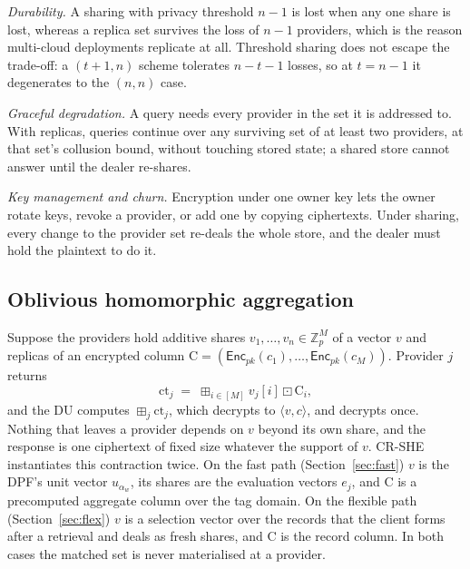 \documentclass[a4paper,fleqn]{cas-sc}
\newcommand{\Enc}{\mathsf{Enc}}
\newcommand{\bplus}{\boxplus}
\newcommand{\bdot}{\boxdot}
\begin{document}
\emph{Durability.} A sharing with privacy threshold $n-1$ is lost when any one
share is lost, whereas a replica set survives the loss of $n-1$ providers,
which is the reason multi-cloud deployments replicate at all. Threshold
sharing does not escape the trade-off: a $(t{+}1,n)$ scheme tolerates
$n-t-1$ losses, so at $t=n-1$ it degenerates to the $(n,n)$ case.

\emph{Graceful degradation.} A query needs every provider in the set it is
addressed to. With replicas, queries continue over any surviving set of at
least two providers, at that set's collusion bound, without touching stored
state; a shared store cannot answer until the dealer re-shares.

\emph{Key management and churn.} Encryption under one owner key lets the owner
rotate keys, revoke a provider, or add one by copying ciphertexts. Under
sharing, every change to the provider set re-deals the whole store, and the
dealer must hold the plaintext to do it.

\subsection{Oblivious homomorphic aggregation}
\label{sec:oha}
Suppose the providers hold additive shares $v_1,\dots,v_n\in\mathbb{Z}_p^{M}$
of a vector $v$ and replicas of an encrypted column
$\mathrm{C}=(\Enc_{pk}(c_1),\dots,\Enc_{pk}(c_M))$. Provider $j$ returns
\[
\text{ct}_j \;=\; \bplus_{i\in[M]} v_j[i]\bdot \mathrm{C}_i ,
\]
and the DU computes $\bplus_j \text{ct}_j$, which decrypts to
$\langle v,c\rangle$, and decrypts once. Nothing that leaves a provider depends
on $v$ beyond its own share, and the response is one ciphertext of fixed size
whatever the support of $v$. CR-SHE instantiates this contraction twice. On the
fast path (Section~\ref{sec:fast}) $v$ is the DPF's unit vector $u_{\alpha_w}$,
its shares are the evaluation vectors $e_j$, and $\mathrm{C}$ is a precomputed
aggregate column over the tag domain. On the flexible path
(Section~\ref{sec:flex}) $v$ is a selection vector over the records that the
client forms after a retrieval and deals as fresh shares, and $\mathrm{C}$ is
the record column. In both cases the matched set is never materialised at a
provider.
\end{document}
